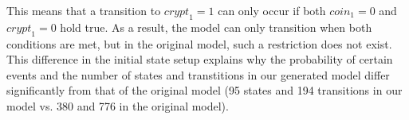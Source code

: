 This means that a transition to $\textit{crypt}_1 = 1$ can only occur if both $\textit{coin}_1 = 0$ and $\textit{crypt}_1 = 0$ hold true. As a result, the model can only transition when both conditions are met, but in the original model, such a restriction does not exist. This difference in the initial state setup explains why the probability of certain events and the number of states and transtitions in our generated model differ significantly from that of the original model (95 states and 194 transitions in our model vs. 380 and 776 in the original model).

